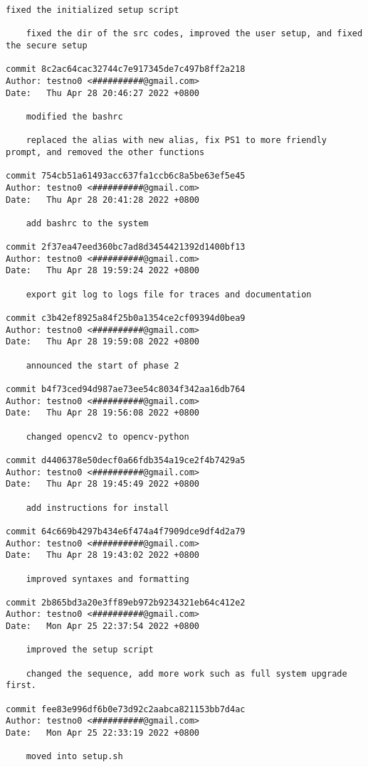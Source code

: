 \documentclass[12pt]{article}
\begin{document}
\begin{lstlisting}[caption={\texttt{git} log of the development.}]
	fixed the initialized setup script

	fixed the dir of the src codes, improved the user setup, and fixed the secure setup

commit 8c2ac64cac32744c7e917345de7c497b8ff2a218
Author: testno0 <##########@gmail.com>
Date:   Thu Apr 28 20:46:27 2022 +0800

	modified the bashrc

	replaced the alias with new alias, fix PS1 to more friendly prompt, and removed the other functions

commit 754cb51a61493acc637fa1ccb6c8a5be63ef5e45
Author: testno0 <##########@gmail.com>
Date:   Thu Apr 28 20:41:28 2022 +0800

	add bashrc to the system

commit 2f37ea47eed360bc7ad8d3454421392d1400bf13
Author: testno0 <##########@gmail.com>
Date:   Thu Apr 28 19:59:24 2022 +0800

	export git log to logs file for traces and documentation

commit c3b42ef8925a84f25b0a1354ce2cf09394d0bea9
Author: testno0 <##########@gmail.com>
Date:   Thu Apr 28 19:59:08 2022 +0800

	announced the start of phase 2

commit b4f73ced94d987ae73ee54c8034f342aa16db764
Author: testno0 <##########@gmail.com>
Date:   Thu Apr 28 19:56:08 2022 +0800

	changed opencv2 to opencv-python

commit d4406378e50decf0a66fdb354a19ce2f4b7429a5
Author: testno0 <##########@gmail.com>
Date:   Thu Apr 28 19:45:49 2022 +0800

	add instructions for install

commit 64c669b4297b434e6f474a4f7909dce9df4d2a79
Author: testno0 <##########@gmail.com>
Date:   Thu Apr 28 19:43:02 2022 +0800

	improved syntaxes and formatting

commit 2b865bd3a20e3ff89eb972b9234321eb64c412e2
Author: testno0 <##########@gmail.com>
Date:   Mon Apr 25 22:37:54 2022 +0800

	improved the setup script

	changed the sequence, add more work such as full system upgrade first.

commit fee83e996df6b0e73d92c2aabca821153bb7d4ac
Author: testno0 <##########@gmail.com>
Date:   Mon Apr 25 22:33:19 2022 +0800

	moved into setup.sh


\end{lstlisting}
\end{document}

